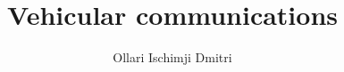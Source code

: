 \documentclass[12pt]{report}
\begin{document}
\title{Vehicular communications}
\author{Ollari Ischimji Dmitri}

\maketitle

\newpage

\tableofcontents
\listoffigures
\listoftables




\end{document}

